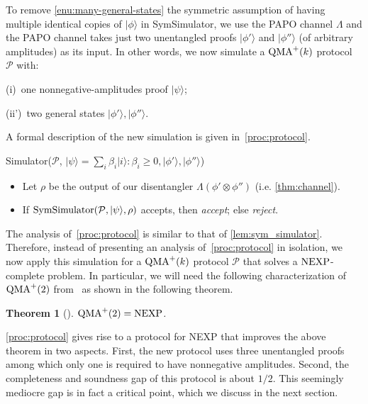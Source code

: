 \documentclass[10pt,a4paper]{article}
\newtheorem{theorem}{Theorem}[section]
\theoremstyle{remark}
\def\cal{\mathcal}
\newcommand{\calP}{{\cal P}}
\newcommand{\1}[1]{\mathds{1}{[#1]}}
\newcommand{\ket}[1]{\lvert #1\rangle}
\newcommand{\QMA}{\textup{QMA}}
\newcommand{\NEXP}{\textup{NEXP}}
\numberwithin{equation}{section}
\begin{document}
To remove  \ref{enu:many-general-states} the symmetric assumption of having multiple identical copies of $\ket{\phi}$ in SymSimulator, we use the PAPO channel $\Lambda$ and the PAPO channel takes
just two unentangled proofs $\ket{\phi'}$ and $\ket{\phi''}$ (of arbitrary amplitudes) as its input. In other words, we now simulate a $\QMA^+(k)$ protocol $\calP$ with:
\begin{description}
    \item \; (i)\, one nonnegative-amplitudes proof $\ket{\psi}$;
    \item (ii')\,  two general states $\ket{\phi'}, \ket{\phi''}$.
\end{description} 
A formal description of the new simulation is given in~\cref{proc:protocol}.

\begin{algorithm}[H]{Simulator}{($\calP$, $\ket{\psi} = \sum_i \beta_i \ket{i} \colon \beta_i \ge 0, \ket{\phi'}, \ket{\phi''}$)}
     \begin{itemize}
       \item Let $\rho$ be the output of our disentangler $\Lambda(\phi'\otimes \phi'')$ (i.e. \cref{thm:channel}).
       \item If $\textup{SymSimulator}(\calP, \ket{\psi},\rho)$ accepts, then \emph{accept}; else \emph{reject}.
     \end{itemize}
     \caption{Protocol Simulator}\label{proc:protocol}
\end{algorithm}

The analysis of~\cref{proc:protocol} is similar to that of \cref{lem:sym_simulator}. Therefore, instead of presenting an analysis of~\cref{proc:protocol} in isolation, we now apply this simulation for a $\QMA^+(k)$ protocol $\calP$ that solves a $\NEXP$-complete problem.  
In particular, we will need the following characterization of $\QMA^+(2)$ from~\cite{JW23} as shown in the following theorem.

\begin{theorem}[\cite{JW23}]\label{thm:qma2_plus_nexp}
  $\QMA^+(2) = \NEXP$.
\end{theorem}

\cref{proc:protocol} gives rise to a protocol for NEXP that improves the above theorem in two aspects. First, the new protocol uses three unentangled proofs among which only one is required to have nonnegative amplitudes. Second, the completeness and soundness gap of this protocol is about $1/2$. This seemingly mediocre gap is in fact a critical point, which we discuss in the next section.
\end{document}

